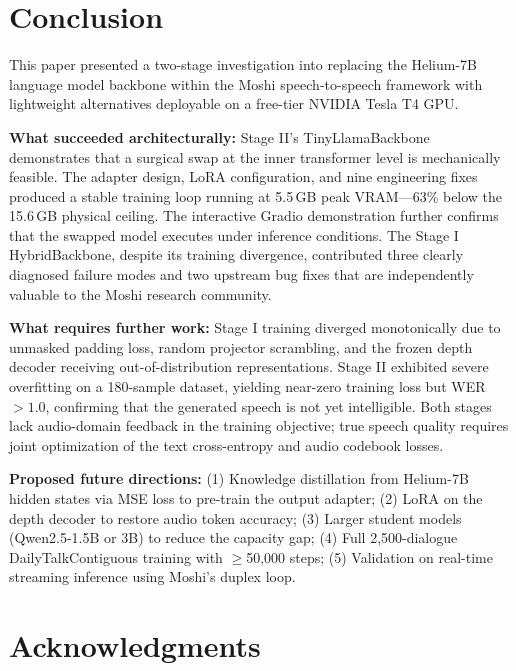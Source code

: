 \documentclass[conference]{IEEEtran}
\begin{document}
\section{Conclusion}
\label{sec:conclusion}

This paper presented a two-stage investigation into replacing the Helium-7B
language model backbone within the Moshi speech-to-speech framework with
lightweight alternatives deployable on a free-tier NVIDIA Tesla T4 GPU.

\textbf{What succeeded architecturally:}
Stage II's TinyLlamaBackbone demonstrates that a surgical swap at the inner
transformer level is mechanically feasible. The adapter design, LoRA
configuration, and nine engineering fixes produced a stable training loop
running at 5.5\,GB peak VRAM---63\% below the 15.6\,GB physical ceiling.
The interactive Gradio demonstration further confirms that the swapped model
executes under inference conditions. The Stage I HybridBackbone, despite its
training divergence, contributed three clearly diagnosed failure modes and two
upstream bug fixes that are independently valuable to the Moshi research
community.

\textbf{What requires further work:}
Stage I training diverged monotonically due to unmasked padding loss, random
projector scrambling, and the frozen depth decoder receiving out-of-distribution
representations. Stage II exhibited severe overfitting on a 180-sample dataset,
yielding near-zero training loss but WER $> 1.0$, confirming that the generated
speech is not yet intelligible. Both stages lack audio-domain feedback in the
training objective; true speech quality requires joint optimization of the text
cross-entropy and audio codebook losses.

\textbf{Proposed future directions:}
(1) Knowledge distillation from Helium-7B hidden states via MSE loss to pre-train
the output adapter; (2) LoRA on the depth decoder to restore audio token accuracy;
(3) Larger student models (Qwen2.5-1.5B or 3B) to reduce the capacity gap;
(4) Full 2,500-dialogue DailyTalkContiguous training with $\geq$50,000 steps;
(5) Validation on real-time streaming inference using Moshi's duplex loop.

\section*{Acknowledgments}
\end{document}
